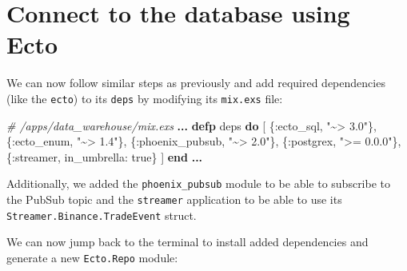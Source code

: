 \documentclass[
  oneside]{book}
\newenvironment{Shaded}{\begin{snugshade}}{\end{snugshade}}
\newcommand{\AttributeTok}[1]{\textcolor[rgb]{0.77,0.63,0.00}{#1}}
\newcommand{\CommentTok}[1]{\textcolor[rgb]{0.56,0.35,0.01}{\textit{#1}}}
\newcommand{\ConstantTok}[1]{\textcolor[rgb]{0.00,0.00,0.00}{#1}}
\newcommand{\ExtensionTok}[1]{#1}
\newcommand{\KeywordTok}[1]{\textcolor[rgb]{0.13,0.29,0.53}{\textbf{#1}}}
\newcommand{\NormalTok}[1]{#1}
\newcommand{\OperatorTok}[1]{\textcolor[rgb]{0.81,0.36,0.00}{\textbf{#1}}}
\newcommand{\StringTok}[1]{\textcolor[rgb]{0.31,0.60,0.02}{#1}}
\newcommand{\VariableTok}[1]{\textcolor[rgb]{0.00,0.00,0.00}{#1}}
\begin{document}
\hypertarget{connect-to-the-database-using-ecto}{%
\section{Connect to the database using Ecto}\label{connect-to-the-database-using-ecto}}

We can now follow similar steps as previously and add required dependencies (like the \texttt{ecto}) to its \texttt{deps} by modifying its \texttt{mix.exs} file:

\begin{Shaded}
\begin{Highlighting}[]
  \CommentTok{\# /apps/data\_warehouse/mix.exs}
  \OperatorTok{...}
  \KeywordTok{defp}\NormalTok{ deps }\KeywordTok{do}
\NormalTok{    [}
\NormalTok{      \{}\VariableTok{:ecto\_sql}\NormalTok{, }\StringTok{"\textasciitilde{}\textgreater{} 3.0"}\NormalTok{\},}
\NormalTok{      \{}\VariableTok{:ecto\_enum}\NormalTok{, }\StringTok{"\textasciitilde{}\textgreater{} 1.4"}\NormalTok{\},}
\NormalTok{      \{}\VariableTok{:phoenix\_pubsub}\NormalTok{, }\StringTok{"\textasciitilde{}\textgreater{} 2.0"}\NormalTok{\},}
\NormalTok{      \{}\VariableTok{:postgrex}\NormalTok{, }\StringTok{"\textgreater{}= 0.0.0"}\NormalTok{\},}
\NormalTok{      \{}\VariableTok{:streamer}\NormalTok{, }\VariableTok{in\_umbrella:} \ConstantTok{true}\NormalTok{\}}
\NormalTok{    ]}
  \KeywordTok{end}
  \OperatorTok{...}
\end{Highlighting}
\end{Shaded}

Additionally, we added the \texttt{phoenix\_pubsub} module to be able to subscribe to the PubSub topic and the \texttt{streamer} application to be able to use its \texttt{Streamer.Binance.TradeEvent} struct.

We can now jump back to the terminal to install added dependencies and generate a new \texttt{Ecto.Repo} module:

\begin{Shaded}
\end{Shaded}
\end{document}
